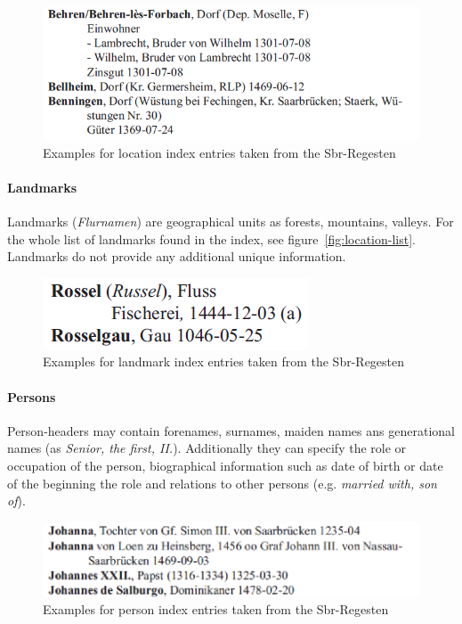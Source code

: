 \begin{figure}[h]
  \centering
  \includegraphics[scale=0.45]{img/location-example}
  \caption{Examples for location index entries taken from the Sbr-Regesten}
  \label{fig:location-example}
\end{figure}

\paragraph{Landmarks}
Landmarks (\textit{Flurnamen}) are geographical units as forests, mountains, valleys. For the whole list of landmarks found in the index, see figure~\ref{fig:location-list}. Landmarks do not provide any additional unique information.%

\begin{figure}[h]
  \centering
  \includegraphics[scale=0.45]{img/landmark-example}
  \caption{Examples for landmark index entries taken from the Sbr-Regesten}
  \label{fig:landmark-example}
\end{figure}

\paragraph{Persons}
Person-headers may contain forenames, surnames, maiden names ans generational names (as \textit{Senior, the first, II.}). Additionally they can specify the role or occupation of the person, biographical information such as date of birth or date of the beginning the role and relations to other persons (e.g. \textit{married with, son of}).%
\begin{figure}[h]
  \centering
  \includegraphics[scale=0.45]{img/person-example}
  \caption{Examples for person index entries taken from the Sbr-Regesten}
  \label{fig:person-example}
\end{figure}

